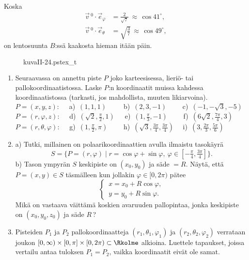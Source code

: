 Koska
\begin{align*}
\vec v\,^0 \cdot \vec e_\varphi &= \frac{2}{\sqrt{7}}\ \approx\, \cos{41^\circ}, \\
\vec v\,^0 \cdot \vec e_\theta &= \sqrt{\frac{3}{7}}\, \approx\, \cos{49^\circ},
\end{align*}
on lentosuunta $B$:ssä kaakosta hieman itään päin. \loppu
\begin{figure}[H]
\begin{center}
{kuvaII-24.pstex_t}
\end{center}
\end{figure}

\Harj
\begin{enumerate}

\item
Seuraavassa on annettu piste $P$ joko karteesisessa, lieriö- tai pallokoordinaatistossa.
Laske $P$:n koordinaatit muissa kahdessa koordinaatistossa (tarkasti, jos mahdollista,
muuten likiarvoina). \vspace{1mm}\newline 
$P=(x,y,z): \quad$ 
a)\, $(1,1,1) \qquad\,$ 
b)\, $(2,3,-1) \qquad$ 
c)\, $(-1,-\sqrt{3},-5)$ \newline
$P=(r,\varphi,z): \quad$
d)\, $(\sqrt{2},\frac{\pi}{2},1) \quad\,$ 
e)\, $(1,\frac{\pi}{3},-1) \qquad$
f)\, $(6\sqrt{2},\frac{7\pi}{4},3)$ \newline
$P=(r,\theta,\varphi): \quad $
g)\, $(1,\frac{\pi}{2},\pi) \qquad$
h)\, $(\sqrt{3},\frac{3\pi}{4},\frac{3\pi}{4}) \quad$
i)\, $(3,\frac{2\pi}{3},\frac{5\pi}{6})$

\item
a) Tutki, millainen on polaarikoordinaattien avulla ilmaistu tasokäyrä
\[
S=\{P=(r,\varphi) \mid r=\cos\varphi+\sin\varphi,\ 
                       \varphi\in[-\tfrac{\pi}{4},\tfrac{3\pi}{4}]\}.
\]
b) Tason ympyrän $S$ keskipiste on $(x_0,y_0)$ ja säde $=R$. Näytä, että
$P=(x,y) \in S$ täsmälleen kun jollakin $\varphi\in[0,2\pi)$ pätee
\[ 
\begin{cases} \,x=x_0+R\cos\varphi, \\ \,y=y_0+R\sin\varphi. \end{cases}
\]
Mikä on vastaava väittämä koskien avaruuden pallopintaa, jonka keskipiste on $(x_0,y_0,z_0)$
ja säde $R$\,?

\item
Pisteiden $P_1$ ja $P_2$ pallokoordinaatteja $(r_1,\theta_1,\varphi_1)$ ja 
$(r_2,\theta_2,\varphi_2)$ verrataan joukon 
$[0,\infty)\times[0,\pi]\times[0,2\pi)\subset\Rkolme$ alkioina. Luettele tapaukset,
joissa vertailu antaa tuloksen $P_1=P_2$, vaikka koordinaatit eivät ole samat.


\end{enumerate}
